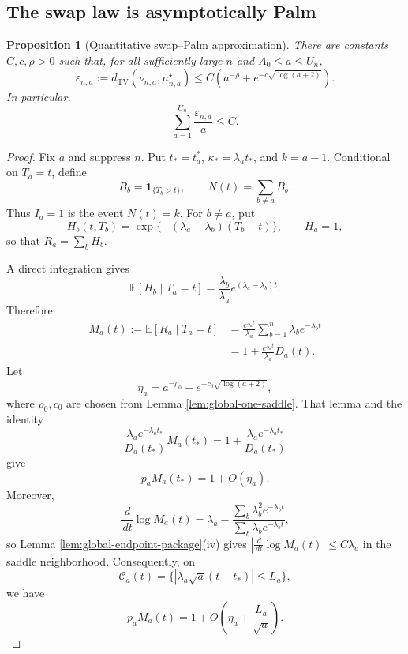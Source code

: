 \documentclass[11pt]{article}
\newtheorem{proposition}[theorem]{Proposition}
\theoremstyle{remark}
\newcommand{\Ee}{\mathbb E}
\newcommand{\one}{\mathbf 1}
\newcommand{\TV}{\mathrm{TV}}
\newcommand{\dd}{\,d}
\begin{document}
\subsection{The swap law is asymptotically Palm}

\begin{proposition}[Quantitative swap--Palm approximation]\label{prop:swap-palm}
There are constants $C,c,\rho>0$ such that, for all sufficiently large $n$ and
$A_0\le a\le U_n$,
\[
        \varepsilon_{n,a}:=
        d_{\TV}(\nu_{n,a},\mu_{n,a}^\star)
        \le C\left(a^{-\rho}+e^{-c\sqrt{\log(a+2)}}\right).
\]
In particular,
\[
        \sum_{a=1}^{U_n}\frac{\varepsilon_{n,a}}a\le C.
\]
\end{proposition}

\begin{proof}
Fix $a$ and suppress $n$.  Put
$t_*=t_a^*$, $\kappa_*=\lambda_at_*$, and $k=a-1$.  Conditional on
$T_a=t$, define
\[
        B_b=\one_{\{T_b>t\}},
        \qquad
        N(t)=\sum_{b\ne a}B_b.
\]
Thus $I_a=1$ is the event $N(t)=k$.  For $b\ne a$, put
\[
        H_b(t,T_b)=
        \exp\{-(\lambda_a-\lambda_b)(T_b-t)\},
        \qquad H_a=1,
\]
so that $R_a=\sum_bH_b$.

A direct integration gives
\[
        \Ee[H_b\mid T_a=t]
        =\frac{\lambda_b}{\lambda_a}
        e^{(\lambda_a-\lambda_b)t}.
\]
Therefore
\[
\begin{aligned}
        M_a(t):=\Ee[R_a\mid T_a=t]
        &=\frac{e^{\lambda_at}}{\lambda_a}
        \sum_{b=1}^n\lambda_be^{-\lambda_bt}\\
        &=1+\frac{e^{\lambda_at}}{\lambda_a}D_a(t).
\end{aligned}
\]
Let
\[
        \eta_a=a^{-\rho_0}+e^{-c_0\sqrt{\log(a+2)}},
\]
where $\rho_0,c_0$ are chosen from Lemma \ref{lem:global-one-saddle}.
That lemma and the identity
\[
        \frac{\lambda_ae^{-\lambda_at_*}}{D_a(t_*)}M_a(t_*)
        =1+\frac{\lambda_ae^{-\lambda_at_*}}{D_a(t_*)}
\]
give
\[
        p_aM_a(t_*)=1+O(\eta_a).
\]
Moreover,
\[
        \frac{\dd}{\dd t}\log M_a(t)
        =\lambda_a-
        \frac{\sum_b\lambda_b^2e^{-\lambda_bt}}
        {\sum_b\lambda_be^{-\lambda_bt}},
\]
so Lemma \ref{lem:global-endpoint-package}(iv) gives
$|\frac{\dd}{\dd t}\log M_a(t)|\le C\lambda_a$ in the saddle
neighborhood.  Consequently, on
\[
        \mathcal C_a(t)=
        \{|\lambda_a\sqrt a(t-t_*)|\le L_a\},
\]
we have
\[
        p_aM_a(t)
        =1+O\left(\eta_a+\frac{L_a}{\sqrt a}\right).
\]


\end{proof}
\end{document}
